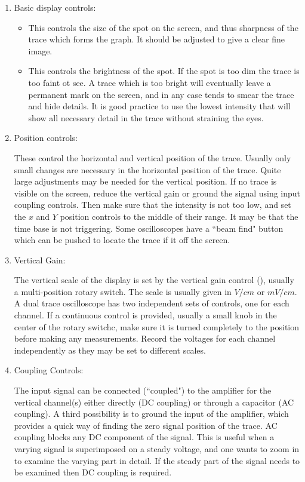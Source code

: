 \documentclass[12pt, a4paper, oneside, openright, titlepage]{book}
\begin{document}
\begin{enumerate}
    \item Basic display controls: \begin{itemize}
            \item {} This controls the size of the spot on the screen, and thus sharpness of the trace which forms the graph. It should be adjusted to give a clear fine image.
            \item {} This controls the brightness of the spot. If the spot is too dim the trace is too faint ot see. A trace which is too bright will eventually leave a permanent mark on the screen, and in any case tends to smear the trace and hide details. It is good practice to use the lowest intensity that will show all necessary detail in the trace without straining the eyes.
    \end{itemize}
    \item Position controls:
        
        These control the horizontal and vertical position of the trace. Usually only small changes are necessary in the horizontal position of the trace. Quite large adjustments may be needed for the vertical position. If no trace is visible on the screen, reduce the vertical gain or ground the signal using input coupling controls. Then make sure that the intensity is not too low, and set the $x$ and $Y$ position controls to the middle of their range. It may be that the time base is not triggering. Some oscilloscopes have a ``beam find" button which can be pushed to locate the trace if it off the screen.
    \item Vertical Gain:

        The vertical scale of the display is set by the vertical gain control (), usually a multi-position rotary switch. The scale is usually given in $V/cm$ or $mV/cm$. A dual trace oscilloscope has two independent sets of controls, one for each channel. If a continuous control is provided, usually a small knob in the center of the rotary switchc, make sure it is turned completely to the  position before making any measurements. Record the voltages for each channel independently as they may be set to different scales.

    \item Coupling Controls:

        The input signal can be connected (``coupled") to the amplifier for the vertical channel(s) either directly (DC coupling) or through a capacitor (AC coupling). A third possibility is to ground the input of the amplifier, which provides a quick way of finding the zero signal position of the trace. AC coupling blocks any DC component of the signal. This is useful when a varying signal is superimposed on a steady voltage, and one wants to zoom in to examine the varying part in detail. If the steady part of the signal needs to be examined then DC coupling is required.


\end{enumerate}
\end{document}
